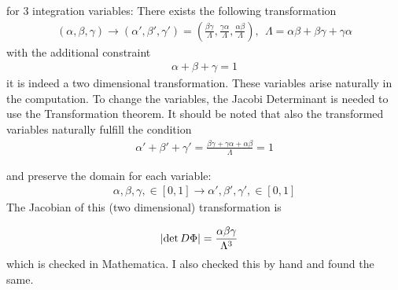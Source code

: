 for 3 integration variables: There exists the following transformation
\begin{align}
	(\alpha, \beta, \gamma) \rightarrow (\alpha',\beta',\gamma') = (\frac{\beta\gamma}{\Lambda},\frac{\gamma\alpha}{\Lambda},\frac{\alpha\beta}{\Lambda}), ~~\Lambda = \alpha \beta + \beta \gamma + \gamma \alpha
\end{align}
with the additional constraint 
\begin{align}
	\alpha + \beta +\gamma =1
\end{align}
it is indeed a two dimensional transformation.
These variables arise naturally in the computation.
To change the variables, the Jacobi Determinant is needed to use the Transformation theorem. It should be noted that also the transformed variables naturally fulfill the condition
\begin{align}
	\alpha' + \beta ' + \gamma ' = \frac{\beta \gamma + \gamma \alpha + \alpha \beta}{\Lambda} = 1
\end{align}

and preserve the domain for each variable:
\begin{align}
	\alpha, \beta, \gamma, \in [0,1] \rightarrow \alpha', \beta', \gamma', \in [0,1]
\end{align}
The Jacobian of this (two dimensional) transformation is

\begin{align}
	\abs{\det D\Phi} &= \frac{\alpha \beta \gamma }{\Lambda ^3} 
\end{align}
which is checked in Mathematica. I also checked this by hand and found the same.
\ifdefined\mainprogram{}
\else

\fi